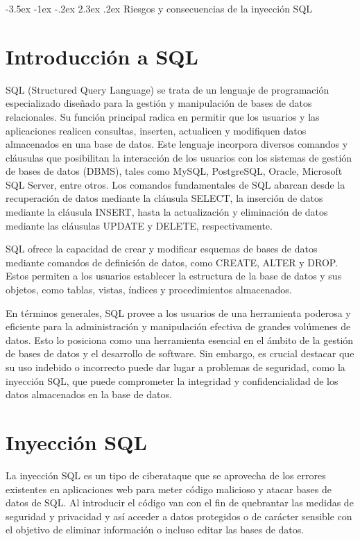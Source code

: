 \documentclass[11pt]{report}
\makeatletter
\renewcommand\chapter{\@startsection{chapter}{0}{\z@}%
    {-3.5ex \@plus -1ex \@minus -.2ex}%
    {2.3ex \@plus.2ex}%
    {\normalfont\Large\bfseries}}
\makeatother
\begin{document}
\cleardoublepage

\chapter{Riesgos y consecuencias de la inyección SQL}
\section{Introducción a SQL}
SQL (Structured Query Language) se trata de un lenguaje de programación especializado
diseñado para la gestión y manipulación de bases de datos relacionales. Su función
principal radica en permitir que los usuarios y las aplicaciones realicen consultas, inserten,
actualicen y modifiquen datos almacenados en una base de datos.
Este lenguaje incorpora diversos comandos y cláusulas que posibilitan la interacción de los
usuarios con los sistemas de gestión de bases de datos (DBMS), tales como MySQL,
PostgreSQL, Oracle, Microsoft SQL Server, entre otros. Los comandos fundamentales de
SQL abarcan desde la recuperación de datos mediante la cláusula SELECT, la inserción de
datos mediante la cláusula INSERT, hasta la actualización y eliminación de datos mediante
las cláusulas UPDATE y DELETE, respectivamente.

SQL ofrece la capacidad de crear y modificar
esquemas de bases de datos mediante comandos de definición de datos, como CREATE,
ALTER y DROP. Estos permiten a los usuarios establecer la estructura de la base de datos
y sus objetos, como tablas, vistas, índices y procedimientos almacenados.

En términos generales, SQL provee a los usuarios de una herramienta poderosa y eficiente
para la administración y manipulación efectiva de grandes volúmenes de datos. Esto lo
posiciona como una herramienta esencial en el ámbito de la gestión de bases de datos y el
desarrollo de software. Sin embargo, es crucial destacar que su uso indebido o incorrecto
puede dar lugar a problemas de seguridad, como la inyección SQL, que puede
comprometer la integridad y confidencialidad de los datos almacenados en la base de datos.

\section{Inyección SQL}
La inyección SQL es un tipo de ciberataque que se aprovecha de los errores existentes en
aplicaciones web para meter código malicioso y atacar bases de datos de SQL. Al introducir
el código van con el fin de quebrantar las medidas de seguridad y privacidad y así acceder a
datos protegidos o de carácter sensible con el objetivo de eliminar información o incluso
editar las bases de datos.
\end{document}
